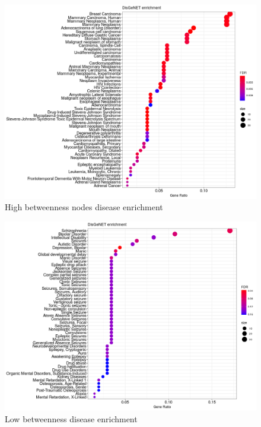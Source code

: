 \begin{figure}
    \centering
    \includegraphics[width=\textwidth]{images/Rplot_high_bet_disgen.png}
    \caption{High betweenness nodes disease enrichment}
    \label{fig:high betweenness disease enrichment}
\end{figure}

\begin{figure}
    \centering
    \includegraphics[width=\textwidth]{images/Rplot_bet_low0point1point.png}
    \caption{Low betweenness disease enrichment}
    \label{fig:low betweenness disease enrichment}
\end{figure}



